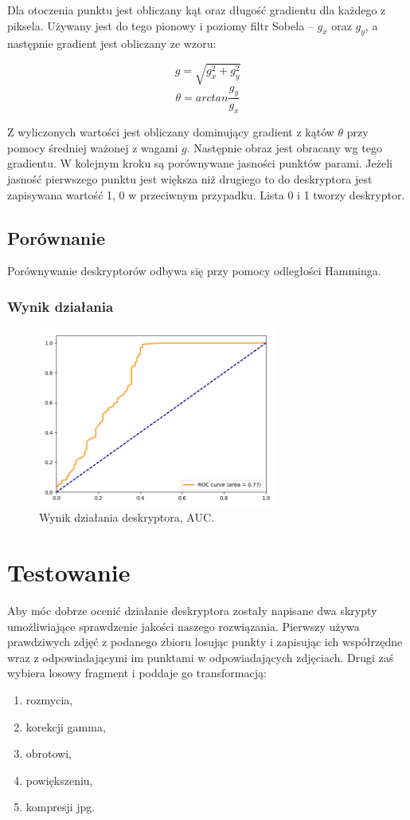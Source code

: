\documentclass[a4paper,11pt]{article}
\begin{document}
Dla otoczenia punktu jest obliczany kąt oraz długość gradientu dla każdego z piksela. Używany jest do tego pionowy i poziomy filtr Sobela -- $g_x$ oraz $g_y$, a następnie gradient jest obliczany ze wzoru:

$$ g = \sqrt{g_x^2 + g_y^2}$$
$$ \theta =arctan \frac{g_y}{g_x}$$

Z wyliczonych wartości jest obliczany dominujący gradient z kątów $\theta$ przy pomocy średniej ważonej z wagami $g$. Następnie obraz jest obracany wg tego gradientu. W kolejnym kroku są porównywane jasności punktów parami. Jeżeli jasność pierwszego punktu jest większa niż drugiego to do deskryptora jest zapisywana wartość 1, 0 w przeciwnym przypadku. Lista 0 i 1 tworzy deskryptor.


\subsection{Porównanie}
Porównywanie deskryptorów odbywa się przy pomocy odległości Hamminga.

\subsubsection{Wynik działania}

\begin{figure}[H]
\begin{center}
\includegraphics[width=0.7\textwidth]{./img/brief.png}
\end{center}
\caption{Wynik działania deskryptora, AUC.}
\end{figure}

\section{Testowanie}
Aby móc dobrze ocenić działanie deskryptora zostały napisane dwa skrypty umożliwiające sprawdzenie jakości naszego rozwiązania. Pierwszy używa prawdziwych zdjęć z podanego zbioru losując punkty i zapisując ich współrzędne wraz z odpowiadającymi im punktami w odpowiadających zdjęciach. Drugi zaś wybiera losowy fragment i poddaje go transformacją:
\begin{enumerate}
\item rozmycia,
\item korekcji gamma,
\item obrotowi,
\item powiększeniu,
\item kompresji jpg.
\end{enumerate}
\end{document}
